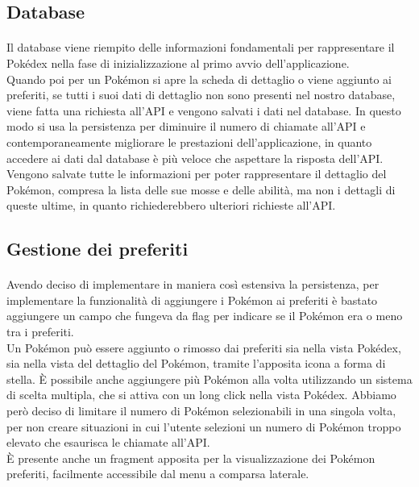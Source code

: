 \documentclass[a4paper,11pt]{article}
\begin{document}
				\subsection{Database}
					\paragraph{}
						Il database viene riempito delle informazioni fondamentali per rappresentare il Pokédex nella fase di inizializzazione al primo avvio dell’applicazione.\\
						Quando poi per un Pokémon si apre la scheda di dettaglio o viene aggiunto ai preferiti, se tutti i suoi dati di dettaglio non sono presenti nel nostro database, viene fatta una richiesta all’API e vengono salvati i dati nel database. In questo modo si usa la persistenza per diminuire il numero di chiamate all’API e contemporaneamente migliorare le prestazioni dell’applicazione, in quanto accedere ai dati dal database è più veloce che aspettare la risposta dell’API.\\
						Vengono salvate tutte le informazioni per poter rappresentare il dettaglio del Pokémon, compresa la lista delle sue mosse e delle abilità, ma non i dettagli di queste ultime, in quanto richiederebbero ulteriori richieste all’API.\\
				\subsection{Gestione dei preferiti}
					\paragraph{}
						Avendo deciso di implementare in maniera così estensiva la persistenza, per implementare la funzionalità di aggiungere i Pokémon ai preferiti è bastato aggiungere un campo che fungeva da flag per indicare se il Pokémon era o meno tra i preferiti.\\
						Un Pokémon può essere aggiunto o rimosso dai preferiti sia nella vista Pokédex, sia nella vista del dettaglio del Pokémon, tramite l’apposita icona a forma di stella. È possibile anche aggiungere più Pokémon alla volta utilizzando un sistema di scelta multipla, che si attiva con un long click nella vista Pokédex. Abbiamo però deciso di limitare il numero di Pokémon selezionabili in una singola volta, per non creare situazioni in cui l’utente selezioni un numero di Pokémon troppo elevato che esaurisca le chiamate all’API.\\
						È presente anche un fragment apposita per la visualizzazione dei Pokémon preferiti, facilmente accessibile dal menu a comparsa laterale.\\
\end{document}
